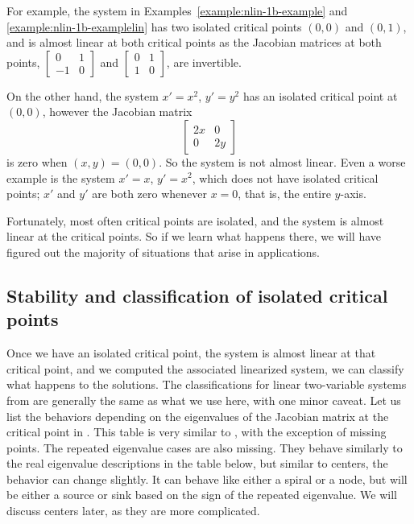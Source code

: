 For example, the system in
Examples~\ref{example:nlin-1b-example} and \ref{example:nlin-1b-examplelin}
has two isolated critical points $(0,0)$ and $(0,1)$, and
is almost linear at both critical points as 
the Jacobian matrices at both points,
$\left[ \begin{smallmatrix} 0 & 1 \\ -1 & 0 \end{smallmatrix} \right]$ and
$\left[ \begin{smallmatrix} 0 & 1 \\ 1 & 0 \end{smallmatrix} \right]$,
are invertible.

On the other hand, the system $x' = x^2$, $y' = y^2$ has an isolated
critical point at $(0,0)$, however the Jacobian matrix
\begin{equation*}
\begin{bmatrix} 2x & 0 \\ 0 & 2y \end{bmatrix}
\end{equation*}
is zero when $(x,y) = (0,0)$.  So the system is not almost
linear. 
Even a worse example is the system $x' = x$, $y' = x^2$, which does not have 
isolated critical points; $x'$ and $y'$ are both zero
whenever $x=0$, that is, the entire $y$-axis.

Fortunately, most often critical
points are isolated, and the system is almost linear at the critical
points.  So if we learn what happens there, we will have figured out the majority
of situations that arise in applications.



\subsection{Stability and classification of isolated critical points}

Once we have an isolated critical point, the system is almost linear at
that critical point, and we computed the
associated linearized system, we can classify what happens to the 
solutions.  The classifications for linear
two-variable systems from  are generally the same as what we use here, with one minor
caveat.
Let us list the behaviors depending on the eigenvalues of
the Jacobian matrix at the critical point in .
This table is very similar to , with
the exception of missing  points.
The repeated eigenvalue cases are also missing. They behave similarly to the real eigenvalue descriptions
in the table below, but similar to centers, the behavior can change slightly.
It can behave like either a spiral or a node, but will be either a source or sink based on the sign of the repeated eigenvalue. 
We will discuss centers later, as they are more complicated.

